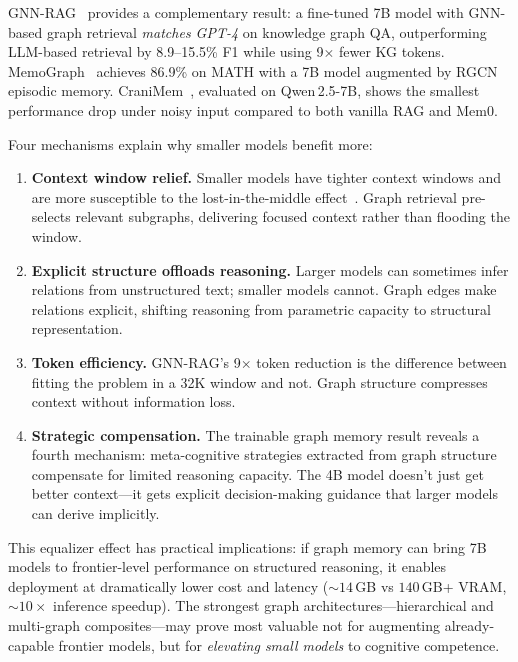 \documentclass[hf]{ceurart}
\begin{document}
GNN-RAG~\cite{gnnrag2025} provides a complementary result: a
fine-tuned 7B model with GNN-based graph retrieval \emph{matches GPT-4}
on knowledge graph QA, outperforming LLM-based retrieval by
8.9--15.5\% F1 while using 9$\times$ fewer KG tokens.
MemoGraph~\cite{memograph2026} achieves 86.9\% on MATH with a 7B model
augmented by RGCN episodic memory. CraniMem~\cite{cranimem2026},
evaluated on Qwen\,2.5-7B, shows the smallest performance drop under
noisy input compared to both vanilla RAG and Mem0.

Four mechanisms explain why smaller models benefit more:
\begin{enumerate}
\item \textbf{Context window relief.} Smaller models have tighter
  context windows and are more susceptible to the
  lost-in-the-middle effect~\cite{litm2024,lostinhaystack2026}.
  Graph retrieval pre-selects relevant subgraphs, delivering
  focused context rather than flooding the window.
\item \textbf{Explicit structure offloads reasoning.} Larger models
  can sometimes infer relations from unstructured text; smaller models
  cannot. Graph edges make relations explicit, shifting reasoning from
  parametric capacity to structural representation.
\item \textbf{Token efficiency.} GNN-RAG's 9$\times$ token reduction
  is the difference between fitting the problem in a 32K window and
  not. Graph structure compresses context without information loss.
\item \textbf{Strategic compensation.} The trainable graph memory
  result reveals a fourth mechanism: meta-cognitive strategies
  extracted from graph structure compensate for limited reasoning
  capacity. The 4B model doesn't just get better context---it gets
  explicit decision-making guidance that larger models can derive
  implicitly.
\end{enumerate}

This equalizer effect has practical implications: if graph memory
can bring 7B models to frontier-level performance on structured
reasoning, it enables deployment at dramatically lower cost and latency
(${\sim}14$\,GB vs $140$\,GB+ VRAM, ${\sim}10\times$ inference
speedup). The strongest graph architectures---hierarchical and
multi-graph composites---may prove most valuable not for augmenting
already-capable frontier models, but for \emph{elevating small models}
to cognitive competence.
\end{document}
